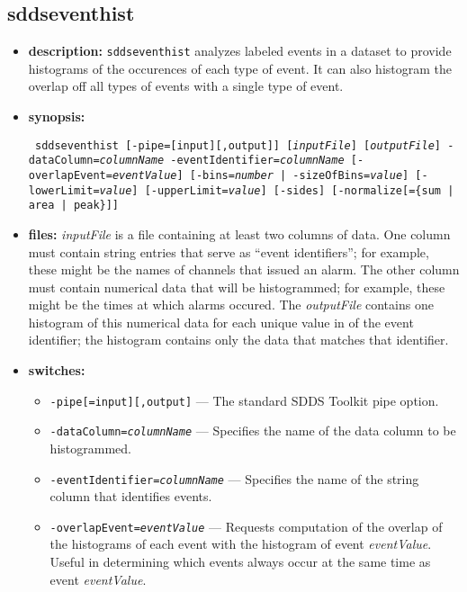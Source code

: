 \newpage
\subsection{sddseventhist}
\label{sddseventhist}

\begin{itemize}
\item {\bf description:} 
{\tt sddseventhist} analyzes labeled events in a dataset to provide
histograms of the occurences of each type of event.  It can also
histogram the overlap off all types of events with a single type of
event.
\item {\bf synopsis:} 
\begin{flushleft}{\tt
sddseventhist [-pipe=[input][,output]] [{\em inputFile}] [{\em outputFile}]
-dataColumn={\em columnName} -eventIdentifier={\em columnName} [-overlapEvent={\em eventValue}]
[{-bins={\em number} | -sizeOfBins={\em value}}] 
[-lowerLimit={\em value}] [-upperLimit={\em value}] 
[-sides] [-normalize[=\{sum | area | peak\}]] 
}\end{flushleft}
\item {\bf files:}
{\em inputFile} is a file containing at least two columns of data.
One column must contain string entries that serve as ``event
identifiers''; for example, these might be the names of channels that
issued an alarm.  The other column must contain numerical data that
will be histogrammed; for example, these might be the times at which
alarms occured.  The {\em outputFile} contains one histogram of this
numerical data for each unique value in of the event identifier; the
histogram contains only the data that matches that identifier.
\item {\bf switches:}
    \begin{itemize}
    \item \verb|-pipe[=input][,output]| --- The standard SDDS Toolkit pipe option.
    \item {\tt -dataColumn={\em columnName}} --- Specifies the name of the data column to be histogrammed.
    \item {\tt -eventIdentifier={\em columnName}} --- Specifies the name of the string column that
        identifies events.
    \item {\tt -overlapEvent={\em eventValue}} --- Requests computation of the overlap of the
        histograms of each event with the histogram of event {\em eventValue}.  Useful in determining
        which events always occur at the same time as event {\em eventValue}.

\end{itemize}
\end{itemize}
